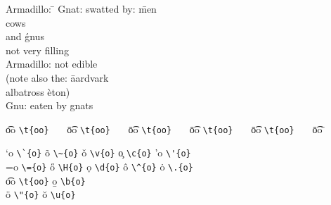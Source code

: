 \documentclass{article}
\begin{document}
\begin{table}
\begin{center}
\begin{tabbing}
Armadillo: \=							\kill
Gnat:      \> swatted by: \= men \+\+   \\
                             cows       \\
                      and \' gnus   \-  \\
              not very filling    \-    \\
Armadillo: \> not edible                \\
\pushtabs
(note also the: \= aardvark             \\
                \> albatross \` eton)   \\
\poptabs
Gnu:            \> eaten by  \>    gnats
\end{tabbing}
\caption{Simplest test case for tabbing environment, should be
three aligned columns}
\end{center}
\end{table}

\begin{table}
\centering
\begin{tabbing}
\t{oo} \= \verb|\t{oo}|~~~ \=
\t{oo} \= \verb|\t{oo}|~~~ \=
\t{oo} \= \verb|\t{oo}|~~~ \=
\t{oo} \= \verb|\t{oo}|~~~ \=
\t{oo} \= \verb|\t{oo}|~~~ \=
\t{oo} \=                       \kill

\a`{o} \> \verb|\`{o}|  \> \~{o}  \> \verb|\~{o}|  \> \v{o}  \> \verb|\v{o}| \>
\c{o}  \> \verb|\c{o}|  \> \a'{o} \> \verb|\'{o}|  \\
\a={o} \> \verb|\={o}|  \> \H{o}  \> \verb|\H{o}|  \> \d{o}  \> \verb|\d{o}| \>
\^{o}  \> \verb|\^{o}|  \> \.{o}  \> \verb|\.{o}|  \\
\t{oo} \> \verb|\t{oo}| \> \b{o}  \> \verb|\b{o}|  \\  \"{o} \> \verb|\"{o}| \>
\u{o}  \> \verb|\u{o}|  \\
\end{tabbing}
\caption{This table only works with with Word 2004 for MacOSX.  Earlier versions fail
to display the {\tt $\backslash$ H\{o\}} correctly because they do not really support unicode.
Other RTF readers get the unicode right, but fail with the
table formatting.}
\end{table}
\end{document}
